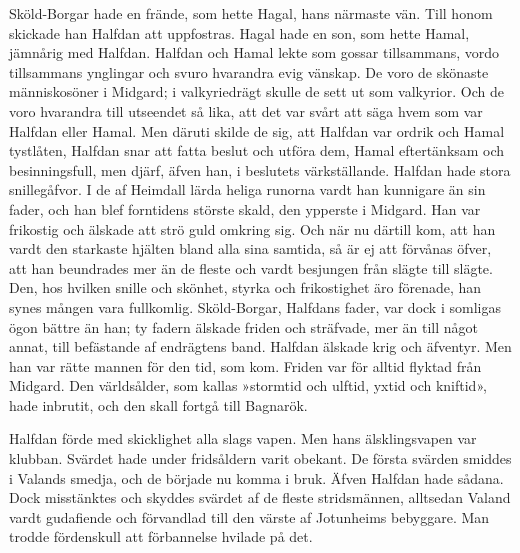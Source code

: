 Sköld-Borgar hade en frände, som hette Hagal, hans närmaste vän. Till
honom skickade han Halfdan att uppfostras. Hagal hade en son, som hette
Hamal, jämnårig med Halfdan. Halfdan och Hamal lekte som gossar
tillsammans, vordo tillsammans ynglingar och svuro hvarandra evig
vänskap. De voro de skönaste människosöner i Midgard; i valkyriedrägt
skulle de sett ut som valkyrior. Och de voro hvarandra till utseendet så
lika, att det var svårt att säga hvem som var Halfdan eller Hamal. Men
däruti skilde de sig, att Halfdan var ordrik och Hamal tystlåten,
Halfdan snar att fatta beslut och utföra dem, Hamal eftertänksam och
besinningsfull, men djärf, äfven han, i beslutets värkställande. Halfdan
hade stora snillegåfvor. I de af Heimdall lärda heliga runorna vardt han
kunnigare än sin fader, och han blef forntidens störste skald, den
ypperste i Midgard. Han var frikostig och älskade att strö guld omkring
sig. Och när nu därtill kom, att han vardt den starkaste hjälten bland
alla sina samtida, så är ej att förvånas öfver, att han beundrades mer
än de fleste och vardt besjungen från slägte till slägte. Den, hos
hvilken snille och skönhet, styrka och frikostighet äro förenade, han
synes mången vara fullkomlig. Sköld-Borgar, Halfdans fader, var dock i
somligas ögon bättre än han; ty fadern älskade friden och sträfvade, mer
än till något annat, till befästande af endrägtens band. Halfdan älskade
krig och äfventyr. Men han var rätte mannen för den tid, som kom. Friden
var för alltid flyktad från Midgard. Den världsålder, som kallas
»stormtid och ulftid, yxtid och kniftid», hade inbrutit, och den skall
fortgå till Bagnarök.



Halfdan förde med skicklighet alla slags vapen. Men hans älsklingsvapen
var klubban. Svärdet hade under fridsåldern varit obekant. De första
svärden smiddes i Valands smedja, och de började nu komma i bruk. Äfven
Halfdan hade sådana. Dock misstänktes och skyddes svärdet af de fleste
stridsmännen, alltsedan Valand vardt gudafiende och förvandlad till den
värste af Jotunheims bebyggare. Man trodde fördenskull att förbannelse
hvilade på det.

